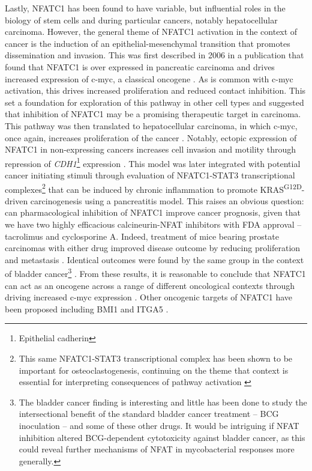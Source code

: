 Lastly, NFATC1 has been found to have variable, but influential roles in the biology of stem cells and during particular cancers, notably hepatocellular carcinoma. However, the general theme of NFATC1 activation in the context of cancer is the induction of an epithelial\hyp{}mesenchymal transition that promotes dissemination and invasion. This was first described in 2006 in a publication that found that NFATC1 is over expressed in pancreatic carcinoma and drives increased expression of c\hyp{}myc, a classical oncogene \citep{Buchholz2006, Eerola2019}. As is common with c\hyp{}myc activation, this drives increased proliferation and reduced contact inhibition. This set a foundation for exploration of this pathway in other cell types and suggested that inhibition of NFATC1 may be a promising therapeutic target in carcinoma. This pathway was then translated to hepatocellular carcinoma, in which c\hyp{}myc, once again, increases proliferation of the cancer \citep{Wang2012}. Notably, ectopic expression of NFATC1 in non\hyp{}expressing cancers increases cell invasion and motility through repression of \textit{CDH1}\footnote{Epithelial cadherin} expression \citep{Oikawa2013}. This model was later integrated with potential cancer initiating stimuli through evaluation of NFATC1\hyp{}STAT3 transcriptional complexes\footnote{This same NFATC1\hyp{}STAT3 transcriptional complex has been shown to be important for osteoclastogenesis, continuing on the theme that context is essential for interpreting consequences of pathway activation \citep{Baumgart2014}} that can be induced by chronic inflammation to promote KRAS\textsuperscript{G12D}\hyp{}driven carcinogenesis using a pancreatitis model. This raises an obvious question: can pharmacological inhibition of NFATC1 improve cancer prognosis, given that we have two highly efficacious calcineurin\hyp{}NFAT inhibitors with FDA approval -- tacrolimus and cyclosporine A. Indeed, treatment of mice bearing prostate carcinomas with either drug improved disease outcome by reducing proliferation and metastasis \citep{Kawahara2015a}. Identical outcomes were found by the same group in the context of bladder cancer\footnote{The bladder cancer finding is interesting and little has been done to study the intersectional benefit of the standard bladder cancer treatment -- BCG inoculation -- and some of these other drugs. It would be intriguing if NFAT inhibition altered BCG-dependent cytotoxicity against bladder cancer, as this could reveal further mechanisms of NFAT in mycobacterial responses more generally.} \citep{Kawahara2015b}. From these results, it is reasonable to conclude that NFATC1 can act as an oncogene across a range of different oncological contexts through driving increased c\hyp{}myc expression \citep{Buchholz2006, Flockhart2009, Seifert2009, Oikawa2013, Kawahara2015a, Kawahara2015b, Liu2021b}. Other oncogenic targets of NFATC1 have been proposed including BMI1 \citep{Wu2019} and ITGA5 \citep{Eerola2019}. 

